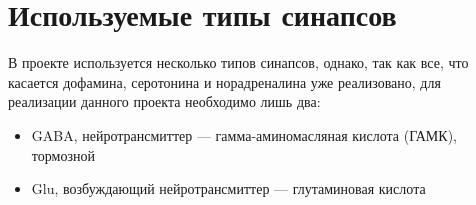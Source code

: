 \section{Используемые типы синапсов}
В проекте используется несколько типов синапсов, однако, так как все, что касается дофамина, серотонина и норадреналина уже реализовано, для реализации данного проекта необходимо лишь два:
\begin{itemize}
	\item GABA, нейротрансмиттер --- гамма-аминомасляная кислота (ГАМК), тормозной
	\item Glu, возбуждающий нейротрансмиттер --- глутаминовая кислота
\end{itemize}

